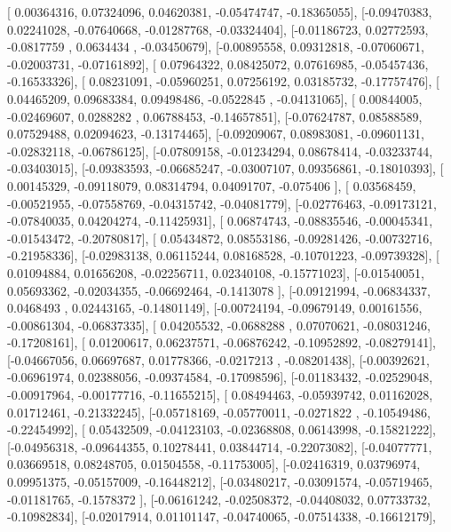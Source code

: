 \documentclass{article}
\begin{document}
       [ 0.00364316,  0.07324096,  0.04620381, -0.05474747, -0.18365055],
       [-0.09470383,  0.02241028, -0.07640668, -0.01287768, -0.03324404],
       [-0.01186723,  0.02772593, -0.0817759 ,  0.0634434 , -0.03450679],
       [-0.00895558,  0.09312818, -0.07060671, -0.02003731, -0.07161892],
       [ 0.07964322,  0.08425072,  0.07616985, -0.05457436, -0.16533326],
       [ 0.08231091, -0.05960251,  0.07256192,  0.03185732, -0.17757476],
       [ 0.04465209,  0.09683384,  0.09498486, -0.0522845 , -0.04131065],
       [ 0.00844005, -0.02469607,  0.0288282 ,  0.06788453, -0.14657851],
       [-0.07624787,  0.08588589,  0.07529488,  0.02094623, -0.13174465],
       [-0.09209067,  0.08983081, -0.09601131, -0.02832118, -0.06786125],
       [-0.07809158, -0.01234294,  0.08678414, -0.03233744, -0.03403015],
       [-0.09383593, -0.06685247, -0.03007107,  0.09356861, -0.18010393],
       [ 0.00145329, -0.09118079,  0.08314794,  0.04091707, -0.075406  ],
       [ 0.03568459, -0.00521955, -0.07558769, -0.04315742, -0.04081779],
       [-0.02776463, -0.09173121, -0.07840035,  0.04204274, -0.11425931],
       [ 0.06874743, -0.08835546, -0.00045341, -0.01543472, -0.20780817],
       [ 0.05434872,  0.08553186, -0.09281426, -0.00732716, -0.21958336],
       [-0.02983138,  0.06115244,  0.08168528, -0.10701223, -0.09739328],
       [ 0.01094884,  0.01656208, -0.02256711,  0.02340108, -0.15771023],
       [-0.01540051,  0.05693362, -0.02034355, -0.06692464, -0.1413078 ],
       [-0.09121994, -0.06834337,  0.0468493 ,  0.02443165, -0.14801149],
       [-0.00724194, -0.09679149,  0.00161556, -0.00861304, -0.06837335],
       [ 0.04205532, -0.0688288 ,  0.07070621, -0.08031246, -0.17208161],
       [ 0.01200617,  0.06237571, -0.06876242, -0.10952892, -0.08279141],
       [-0.04667056,  0.06697687,  0.01778366, -0.0217213 , -0.08201438],
       [-0.00392621, -0.06961974,  0.02388056, -0.09374584, -0.17098596],
       [-0.01183432, -0.02529048, -0.00917964, -0.00177716, -0.11655215],
       [ 0.08494463, -0.05939742,  0.01162028,  0.01712461, -0.21332245],
       [-0.05718169, -0.05770011, -0.0271822 , -0.10549486, -0.22454992],
       [ 0.05432509, -0.04123103, -0.02368808,  0.06143998, -0.15821222],
       [-0.04956318, -0.09644355,  0.10278441,  0.03844714, -0.22073082],
       [-0.04077771,  0.03669518,  0.08248705,  0.01504558, -0.11753005],
       [-0.02416319,  0.03796974,  0.09951375, -0.05157009, -0.16448212],
       [-0.03480217, -0.03091574, -0.05719465, -0.01181765, -0.1578372 ],
       [-0.06161242, -0.02508372, -0.04408032,  0.07733732, -0.10982834],
       [-0.02017914,  0.01101147, -0.04740065, -0.07514338, -0.16612179],
\end{document}
